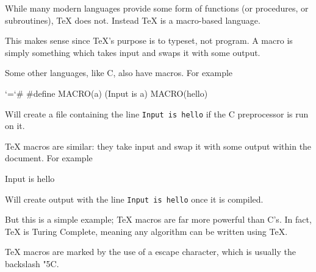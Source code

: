 {{    
\endslide

\beginslide

    {\def\_buffer_height{10pt}
    \textbox{}
        \centerline{\headerfont\color{white}}
    \endtextbox
    }

\endslide

\beginslide

    {\def\_buffer_height{10pt}
    \textbox{}
        \centerline{\headerfont\color{white}}
    \endtextbox
    }

\endslide

\beginslide
    \oheadline

    \textbox\empty{1cm}{2cm}{\hsize-2cm}{}
        While many modern languages provide some form of functions (or procedures, or subroutines), \TeX{} does not.
        Instead \TeX{} is a macro-based language.

        This makes sense since \TeX's purpose is to typeset, not program.
        A macro is simply something which takes input and swaps it with some output.

        Some other languages, like C, also have macros.
        For example

{\bgroup\lccode`\?=`\# \lowercase{\egroup{}}
\beginhi
#define MACRO(a) (Input is a)
MACRO(hello)
\endhi
}

        Will create a file containing the line {\tt Input is hello} if the C preprocessor is run on it.

        \TeX{} macros are similar: they take input and swap it with some output within the document.
        For example

\beginhi
\def\macro#1{Input is #1}
\macro{hello}
\endhi

        Will create output with the line {\tt Input is hello} once it is compiled.

        But this is a simple example; \TeX{} macros are far more powerful than C's.
        In fact, \TeX{} is Turing Complete, meaning any algorithm can be written using \TeX{}.
    \endtextbox

\endslide

\beginslide
    \oheadline

    \textbox\empty{1cm}{2cm}{\hsize-2cm}{}
        \TeX{} macros are marked by the use of a {\fifteenit escape character}, which is usually the backslash
        {\fifteentt\char"5C}.

}}
